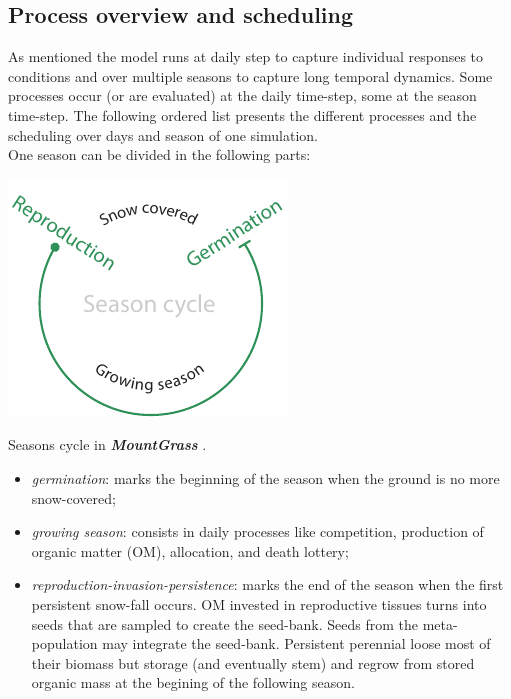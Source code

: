 \documentclass[a4paper,twoside, justified,marginals=raggedright, nobib]{tufte-handout}
\newcommand{\model}{\textit{\textbf{MountGrass }}}
\begin{document}

\subsection{Process overview and scheduling}

As mentioned the model runs at daily step to capture individual responses to conditions and over multiple seasons to capture long temporal dynamics. Some processes occur (or are evaluated) at the daily time-step, some at the season time-step. The following ordered list presents the different processes and the scheduling over days and season of one simulation.\\
\indent One season can be divided in the following parts:
\begin{marginfigure}
\includegraphics{./Figures/season_cycle_m.pdf}
\caption{Seasons cycle in \model.}
\end{marginfigure}
\begin{itemize}
\setlength\itemsep{0em}
\item \textit{germination}: marks the beginning of the season when the ground is no more snow-covered;
\item \textit{growing season}: consists in daily processes like competition, production of organic matter (OM), allocation, and death lottery;
\item \textit{reproduction-invasion-persistence}: marks the end of the season when the first persistent snow-fall occurs. OM invested in reproductive tissues turns into seeds that are sampled to create the seed-bank. Seeds from the meta-population may integrate the seed-bank. Persistent perennial loose most of their biomass but storage (and eventually stem) and regrow from stored organic mass at the begining of the following season.
\end{itemize}
\end{document}
